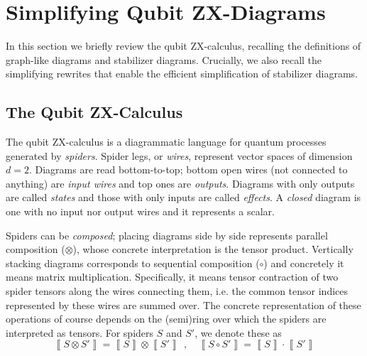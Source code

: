 \section{Simplifying Qubit ZX-Diagrams}

In this section we briefly review the qubit ZX-calculus, recalling the definitions of graph-like diagrams and stabilizer diagrams.
Crucially, we also recall the simplifying rewrites that enable the efficient
simplification of stabilizer diagrams.

\subsection{The Qubit ZX-Calculus}

The qubit ZX-calculus is a diagrammatic language for quantum processes generated by \emph{spiders}.
Spider legs, or \emph{wires}, represent vector spaces of dimension $d=2$.
Diagrams are read bottom-to-top; bottom open wires (not connected to anything) are \emph{input wires} and top ones are \emph{outputs}.
Diagrams with only outputs are called \emph{states} and those with only inputs are called \emph{effects}.
A \emph{closed} diagram is one with no input nor output wires
and it represents a scalar.

Spiders can be \emph{composed};
placing diagrams side by side represents parallel composition ($\otimes$),
whose concrete interpretation is the tensor product.
Vertically stacking diagrams corresponds to sequential composition ($\circ$) and concretely it means matrix multiplication.
Specifically, it means tensor contraction of two spider tensors along the wires connecting them, i.e. the common tensor indices represented by these wires are summed over.
The concrete representation of these operations of course depends on the (semi)ring over which the spiders are interpreted as tensors.
For spiders $S$ and $S'$, we denote these as
\begin{equation}
\left\llbracket S \otimes S' \right\rrbracket = \left\llbracket S \right\rrbracket \otimes \left\llbracket S' \right\rrbracket ~~,\quad
	\left\llbracket S \circ S' \right\rrbracket = \left\llbracket S \right\rrbracket \cdot \left\llbracket S' \right\rrbracket 
\end{equation} 


